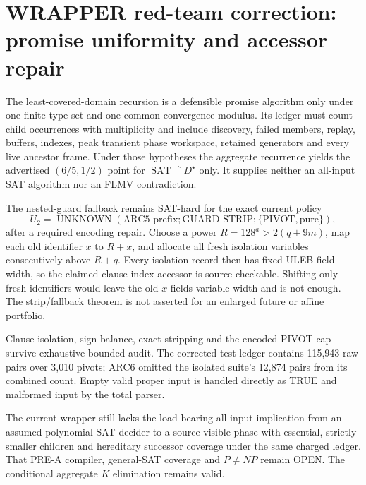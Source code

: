 \section{WRAPPER red-team correction: promise uniformity and accessor repair}

The least-covered-domain recursion is a defensible promise algorithm only
under one finite type set and one common convergence modulus.  Its ledger
must count child occurrences with multiplicity and include discovery,
failed members, replay, buffers, indexes, peak transient phase workspace,
retained generators and every live ancestor frame.  Under those hypotheses
the aggregate recurrence yields the advertised $(6/5,1/2)$ point for
$\operatorname{SAT}\upharpoonright D^\star$ only.  It supplies neither an
all-input SAT algorithm nor an FLMV contradiction.

The nested-guard fallback remains SAT-hard for the exact current policy
\[
 U_2=\operatorname{UNKNOWN}(\text{ARC5 prefix};\mathrm{GUARD\mbox{-}STRIP};
     \{\mathrm{PIVOT},\mathrm{pure}\}),
\]
after a required encoding repair.  Choose a power $R=128^a>2(q+9m)$, map
each old identifier $x$ to $R+x$, and allocate all fresh isolation variables
consecutively above $R+q$.  Every isolation record then has fixed ULEB field
width, so the claimed clause-index accessor is source-checkable.  Shifting
only fresh identifiers would leave the old $x$ fields variable-width and is
not enough.  The strip/fallback theorem is not asserted for an enlarged
future or affine portfolio.

Clause isolation, sign balance, exact stripping and the encoded PIVOT cap
survive exhaustive bounded audit.  The corrected test ledger contains
115,943 raw pairs over 3,010 pivots; ARC6 omitted the isolated suite's 12,874
pairs from its combined count.  Empty valid proper input is handled directly
as TRUE and malformed input by the total parser.

The current wrapper still lacks the load-bearing all-input implication from
an assumed polynomial SAT decider to a source-visible phase with essential,
strictly smaller children and hereditary successor coverage under the same
charged ledger.  That PRE-A compiler, general-SAT coverage and $P\ne NP$
remain OPEN.  The conditional aggregate $K$ elimination remains valid.

